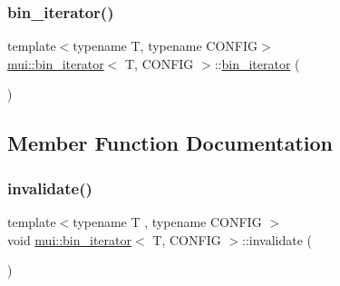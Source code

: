 \mbox{\label{structmui_1_1bin__iterator_afb02d18499dea2d212b2d220f69ce749}} 
\subsubsection{\texorpdfstring{bin\+\_\+iterator()}{bin\_iterator()}\hspace{0.1cm}{\footnotesize\ttfamily [3/3]}}
{\footnotesize\ttfamily template$<$typename T, typename C\+O\+N\+F\+IG$>$ \\
\hyperlink{structmui_1_1bin__iterator}{mui\+::bin\+\_\+iterator}$<$ T, C\+O\+N\+F\+IG $>$\+::\hyperlink{structmui_1_1bin__iterator}{bin\+\_\+iterator} (\begin{DoxyParamCaption}\item[{const \hyperlink{structmui_1_1bin__iterator}{bin\+\_\+iterator}$<$ T, C\+O\+N\+F\+IG $>$ \&}]{ }\end{DoxyParamCaption})\hspace{0.3cm}{\ttfamily [default]}}



\subsection{Member Function Documentation}
\mbox{\label{structmui_1_1bin__iterator_a9dd12ec01e52a6aac8a2aa511b4a0849}} 
\subsubsection{\texorpdfstring{invalidate()}{invalidate()}}
{\footnotesize\ttfamily template$<$typename T , typename C\+O\+N\+F\+IG $>$ \\
void \hyperlink{structmui_1_1bin__iterator}{mui\+::bin\+\_\+iterator}$<$ T, C\+O\+N\+F\+IG $>$\+::invalidate (\begin{DoxyParamCaption}{ }\end{DoxyParamCaption})\hspace{0.3cm}{\ttfamily [inline]}}

\mbox{\label{structmui_1_1bin__iterator_abb2f0a6ce3579fa7f33409da0b295ea1}} 
